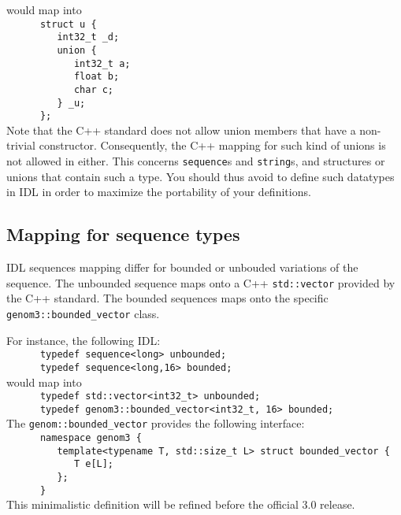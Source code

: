 would map into\hfill\\
\verb|      struct u {|\hfill\\
\verb|         int32_t _d;|\hfill\\
\verb|         union {|\hfill\\
\verb|            int32_t a;|\hfill\\
\verb|            float b;|\hfill\\
\verb|            char c;|\hfill\\
\verb|         } _u;|\hfill\\
\verb|      };|\hfill\\

Note that the C++ standard does  not allow union members that have a non-trivial
constructor.   Consequently, the C++  mapping for  such kind  of unions  is not
allowed in  \GenoM{} either. This  concerns {\tt sequence}s and  {\tt string}s,
and structures  or unions that  contain such a  type. You should thus  avoid to
define such datatypes  in \GenoM{} IDL in order to  maximize the portability of
your definitions.

\subsection{Mapping for sequence types}

\GenoM{} IDL sequences mapping differ for bounded or unbouded variations of the
sequence. The unbounded sequence maps  onto a C++ {\tt std::vector} provided by
the  C++  standard.   The  bounded  sequences  maps  onto   the  specific  {\tt
genom3::bounded\_vector} class.

For instance, the following IDL:\hfill\\
\verb|      typedef sequence<long> unbounded;|\hfill\\
\verb|      typedef sequence<long,16> bounded;|\hfill\\

would map into\hfill\\
\verb|      typedef std::vector<int32_t> unbounded;|\hfill\\
\verb|      typedef genom3::bounded_vector<int32_t, 16> bounded;|\hfill\\

The {\tt genom::bounded\_vector} provides the following interface:\hfill\\
\verb|      namespace genom3 {|\hfill\\
\verb|         template<typename T, std::size_t L> struct bounded_vector {|\hfill\\
\verb|            T e[L];|\hfill\\
\verb|         };|\hfill\\
\verb|      }|\hfill\\

This minimalistic definition will be refined before the official 3.0 \GenoM{}
release.
